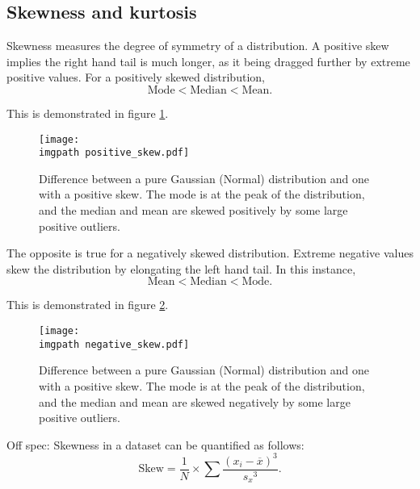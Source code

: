 \documentclass[../notes_compiled.tex]{subfiles}
\begin{document}
\subsection{Skewness and kurtosis}
\begin{itemize}
\item Skewness measures the degree of symmetry of a distribution. A positive skew implies the right hand tail is much longer, as it being dragged further by extreme positive values. For a positively skewed distribution, 
\begin{equation*}
\text{Mode} < \text{Median} < \text{Mean}.
\end{equation*}

This is demonstrated in figure \ref{fig-positive-skew}.

\begin{figure}[h!]
  \centering
  \texttt{[image: \\imgpath positive\_skew.pdf]}
  \caption{Difference between a pure Gaussian (Normal) distribution and one with a positive skew. The mode is at the peak of the distribution, and the median and mean are skewed positively by some large positive outliers.}
  \label{fig-positive-skew}
\end{figure}


\item[] The opposite is true for a negatively skewed distribution. Extreme negative values skew the distribution by elongating the left hand tail. In this instance, 
\begin{equation*}
\text{Mean} < \text{Median} < \text{Mode}.
\end{equation*}

This is demonstrated in figure \ref{fig-negative-skew}.

\begin{figure}[h!]
  \centering
  \texttt{[image: \\imgpath negative\_skew.pdf]}
  \caption{Difference between a pure Gaussian (Normal) distribution and one with a positive skew. The mode is at the peak of the distribution, and the median and mean are skewed negatively by some large positive outliers.}
  \label{fig-negative-skew}
\end{figure}

{\color{ForestGreen}
\item[] Off spec: Skewness in a dataset can be quantified as follows:
\begin{equation*}
\text{Skew} = \frac{1}{N} \times\sum\frac{\left(x_{i}-\overline{x}\right)^{3}}{{s_{x}}^{3}}.
\end{equation*}
}


\end{itemize}
\end{document}
